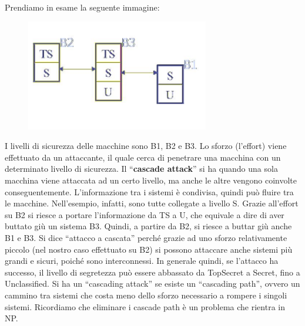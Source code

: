 Prendiamo in esame la seguente immagine:
\begin{figure}[H]
    \centering
    \includegraphics[width=8cm, keepaspectratio]{capitoli/policy/imgs/cascade1.png}
\end{figure}
I livelli di sicurezza delle macchine sono B1, B2 e B3. Lo
sforzo (l'effort) viene effettuato da un attaccante, il quale
cerca di penetrare una macchina con un determinato livello
di sicurezza.
Il “\textbf{cascade attack}” si ha quando una sola macchina viene attaccata ad
un certo livello, ma anche
le altre vengono coinvolte conseguentemente.
L'informazione tra i sistemi è condivisa, quindi può fluire tra le macchine.
Nell'esempio, infatti, sono
tutte collegate a livello S. Grazie all'effort su B2 si riesce a portare
l'informazione da TS a U, che
equivale a dire di aver buttato giù un sistema B3. Quindi, a partire da B2,
si riesce a buttar giù
anche B1 e B3.
Si dice “attacco a cascata” perché grazie ad uno sforzo relativamente piccolo
(nel nostro caso
effettuato su B2) si possono attaccare anche sistemi più grandi e sicuri,
poiché sono interconnessi.
In generale quindi, se l'attacco ha successo, il livello di segretezza può
essere abbassato da
TopSecret a Secret, fino a Unclassified.
Si ha un “cascading attack” se esiste un “cascading path”, ovvero un cammino
tra sistemi che
costa meno dello sforzo necessario a rompere i singoli sistemi.
Ricordiamo che eliminare i cascade path è un problema che rientra in NP.

